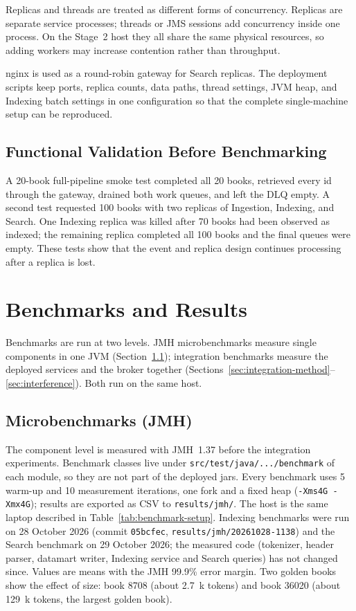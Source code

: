 \documentclass[12pt,a4paper]{article}
\begin{document}
Replicas and threads are treated as different forms of concurrency. Replicas are separate service
processes; threads or JMS sessions add concurrency inside one process. On the Stage~2 host they all
share the same physical resources, so adding workers may increase contention rather than
throughput.

nginx is used as a round-robin gateway for Search replicas. The deployment scripts keep ports,
replica counts, data paths, thread settings, JVM heap, and Indexing batch settings in one
configuration so that the complete single-machine setup can be reproduced.

\subsection{Functional Validation Before Benchmarking}

A 20-book full-pipeline smoke test completed all 20 books, retrieved every id through the gateway,
drained both work queues, and left the DLQ empty. A second test requested 100 books with two
replicas of Ingestion, Indexing, and Search. One Indexing replica was killed after 70 books had
been observed as indexed; the remaining replica completed all 100 books and the final queues were
empty. These tests show that the event and replica design continues processing after a replica is
lost.

\section{Benchmarks and Results}
\label{sec:benchmarks}
Benchmarks are run at two levels. JMH microbenchmarks measure single components in one JVM
(Section~\ref{sec:jmh}); integration benchmarks measure the deployed services and the broker
together (Sections~\ref{sec:integration-method}--\ref{sec:interference}). Both run on the same
host.

\subsection{Microbenchmarks (JMH)}
\label{sec:jmh}

The component level is measured with JMH~1.37 before the integration experiments. Benchmark
classes live under \texttt{src/test/java/.../benchmark} of each module, so they are not part of
the deployed jars. Every benchmark uses 5 warm-up and 10 measurement iterations, one fork and a
fixed heap (\texttt{-Xms4G -Xmx4G}); results are exported as CSV to \texttt{results/jmh/}. The
host is the same laptop described in Table~\ref{tab:benchmark-setup}. Indexing benchmarks were run on
28 October 2026 (commit \texttt{05bcfec}, \texttt{results/jmh/20261028-1138}) and the Search
benchmark on 29 October 2026; the measured code (tokenizer, header parser, datamart writer,
Indexing service and Search queries) has not changed since. Values are means with the JMH 99.9\%
error margin. Two golden books show the effect of size: book 8708 (about 2.7~k tokens) and book
36020 (about 129~k tokens, the largest golden book).
\end{document}
